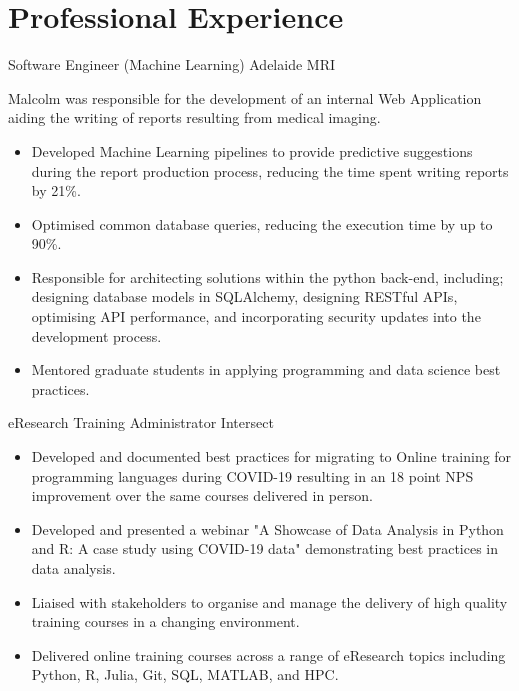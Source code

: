 



\makecvtitle{}
\vspace{-4em}

\section{Professional Experience}


{Software Engineer (Machine Learning)}
{Adelaide MRI}{}{}
{%
  Malcolm was responsible for the development of an internal Web Application
  aiding the writing of reports resulting from medical imaging.
  \begin{itemize}
    \item Developed Machine Learning pipelines to provide predictive
      suggestions during the report production process, reducing the time spent
      writing reports by 21\%.
    \item Optimised common database queries, reducing the execution time by
      up to 90\%.
    \item Responsible for architecting solutions
      within the python back-end, including;
      designing database models in SQLAlchemy,
      designing RESTful APIs,
      optimising API performance,
      and incorporating security updates into the development process.
    \item Mentored graduate students in applying programming and data science
      best practices.
  \end{itemize}
}

{eResearch Training Administrator}
{Intersect}{}{}
{%
  \begin{itemize}
    \item Developed and documented best practices for migrating to Online
      training for programming languages during COVID-19 resulting in an
      18 point NPS improvement over the same courses delivered in person.
    \item Developed and presented a webinar
      {"A Showcase of Data Analysis in Python and R: A case study using COVID-19 data"}
      demonstrating best practices in data analysis.
    \item Liaised with stakeholders to organise and manage the delivery of high
      quality training courses in a changing environment.
    \item Delivered online training courses across a range of eResearch topics
      including Python, R, Julia, Git, SQL, MATLAB, and HPC.
  \end{itemize}
}

